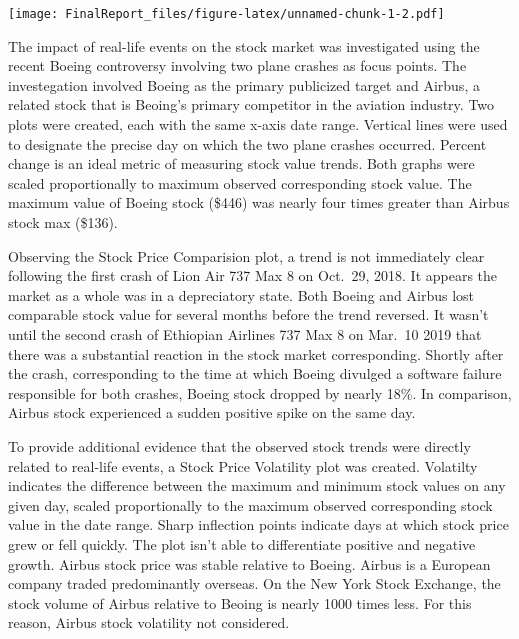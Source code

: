 \documentclass[]{article}
\newenvironment{Shaded}{\begin{snugshade}}{\end{snugshade}}
\newcommand{\DataTypeTok}[1]{\textcolor[rgb]{0.13,0.29,0.53}{#1}}
\newcommand{\DecValTok}[1]{\textcolor[rgb]{0.00,0.00,0.81}{#1}}
\newcommand{\FloatTok}[1]{\textcolor[rgb]{0.00,0.00,0.81}{#1}}
\newcommand{\KeywordTok}[1]{\textcolor[rgb]{0.13,0.29,0.53}{\textbf{#1}}}
\newcommand{\NormalTok}[1]{#1}
\newcommand{\OperatorTok}[1]{\textcolor[rgb]{0.81,0.36,0.00}{\textbf{#1}}}
\newcommand{\StringTok}[1]{\textcolor[rgb]{0.31,0.60,0.02}{#1}}
\begin{document}
\begin{Shaded}
\begin{Highlighting}[]
{\StringTok{  }\KeywordTok{annotate}\NormalTok{(}\StringTok{"text"}\NormalTok{, }\DataTypeTok{x=}\KeywordTok{as.Date}\NormalTok{(}\StringTok{"2018-12-26"}\NormalTok{), }
           \DataTypeTok{y=}\NormalTok{ba_df[ba_df}\OperatorTok{$}\NormalTok{date }\OperatorTok{==}\StringTok{ }\KeywordTok{as.Date}\NormalTok{(}\StringTok{"2018-12-26"}\NormalTok{), }\DecValTok{8}\NormalTok{], }\DataTypeTok{label=}\StringTok{"D"}\NormalTok{, }\DataTypeTok{vjust=}\OperatorTok{-}\FloatTok{0.5}\NormalTok{, }\DataTypeTok{hjust=}\FloatTok{0.5}\NormalTok{, }\DataTypeTok{size=}\DecValTok{3}\NormalTok{)}
\end{Highlighting}
\end{Shaded}

\texttt{[image: FinalReport\_files/figure-latex/unnamed-chunk-1-2.pdf]}

The impact of real-life events on the stock market was investigated
using the recent Boeing controversy involving two plane crashes as focus
points. The investegation involved Boeing as the primary publicized
target and Airbus, a related stock that is Beoing's primary competitor
in the aviation industry. Two plots were created, each with the same
x-axis date range. Vertical lines were used to designate the precise day
on which the two plane crashes occurred. Percent change is an ideal
metric of measuring stock value trends. Both graphs were scaled
proportionally to maximum observed corresponding stock value. The
maximum value of Boeing stock (\$446) was nearly four times greater than
Airbus stock max (\$136).

Observing the Stock Price Comparision plot, a trend is not immediately
clear following the first crash of Lion Air 737 Max 8 on Oct.~29, 2018.
It appears the market as a whole was in a depreciatory state. Both
Boeing and Airbus lost comparable stock value for several months before
the trend reversed. It wasn't until the second crash of Ethiopian
Airlines 737 Max 8 on Mar.~10 2019 that there was a substantial reaction
in the stock market corresponding. Shortly after the crash,
corresponding to the time at which Boeing divulged a software failure
responsible for both crashes, Boeing stock dropped by nearly 18\%. In
comparison, Airbus stock experienced a sudden positive spike on the same
day.

To provide additional evidence that the observed stock trends were
directly related to real-life events, a Stock Price Volatility plot was
created. Volatilty indicates the difference between the maximum and
minimum stock values on any given day, scaled proportionally to the
maximum observed corresponding stock value in the date range. Sharp
inflection points indicate days at which stock price grew or fell
quickly. The plot isn't able to differentiate positive and negative
growth. Airbus stock price was stable relative to Boeing. Airbus is a
European company traded predominantly overseas. On the New York Stock
Exchange, the stock volume of Airbus relative to Beoing is nearly 1000
times less. For this reason, Airbus stock volatility not considered.
\end{document}
